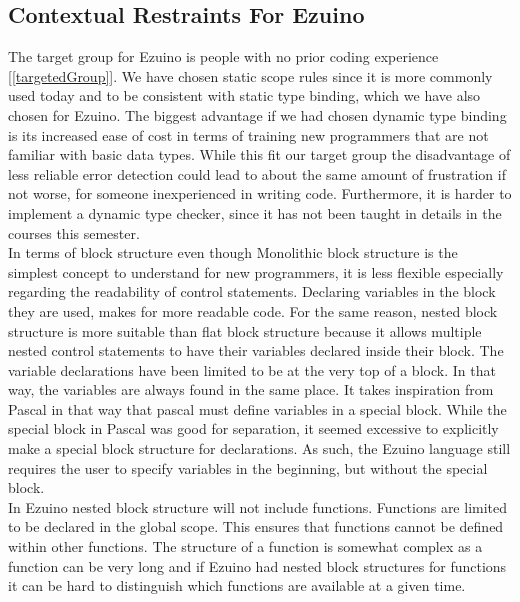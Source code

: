 \subsection{Contextual Restraints For Ezuino}
The target group for Ezuino is people with no prior coding experience [\ref{targetedGroup}]. We have chosen static scope rules since it is more commonly used today and to be consistent with static type binding, which we have also chosen for Ezuino. The biggest advantage if we had chosen dynamic type binding is its increased ease of cost in terms of training new programmers that are not familiar with basic data types. While this fit our target group the disadvantage of less reliable error detection could lead to about the same amount of frustration if not worse, for someone inexperienced in writing code. Furthermore, it is harder to implement a dynamic type checker, since it has not been taught in details in the courses this semester. \\
In terms of block structure even though Monolithic block structure is the simplest concept to understand for new programmers, it is less flexible especially regarding the readability of control statements. Declaring variables in the block they are used, makes for more readable code. For the same reason, nested block structure is more suitable than flat block structure because it allows multiple nested control statements to have their variables declared inside their block.
The variable declarations have been limited to be at the very top of a block. In that way, the variables are always found in the same place. It takes inspiration from Pascal in that way that pascal must define variables in a special block. While the special block in Pascal was good for separation, it seemed excessive to explicitly make a special block structure for declarations. As such, the Ezuino language still requires the user to specify variables in the beginning, but without the special block. \\
In Ezuino nested block structure will not include functions. Functions are limited to be declared in the global scope. This ensures that functions cannot be defined within other functions. The structure of a function is somewhat complex as a function can be very long and if Ezuino had nested block structures for functions it can be hard to distinguish which functions are available at a given time.

